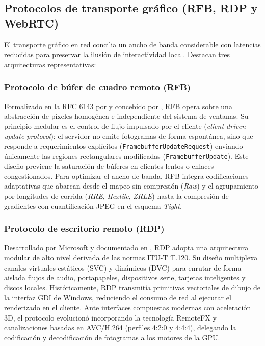 \documentclass[12pt]{article}
\begin{document}
\subsection{Protocolos de transporte gráfico (RFB, RDP y WebRTC)}\label{sec:protocolosTransporte}

El transporte gráfico en red concilia un ancho de banda considerable con latencias reducidas para preservar la ilusión de interactividad local. Destacan tres arquitecturas representativas:

\subsubsection{Protocolo de búfer de cuadro remoto (RFB)}
Formalizado en la RFC 6143 por \textcite{rfc6143} y concebido por \textcite{richardson1998virtual}, RFB opera sobre una abstracción de píxeles homogénea e independiente del sistema de ventanas. Su principio medular es el control de flujo impulsado por el cliente (\textit{client-driven update protocol}): el servidor no emite fotogramas de forma espontánea, sino que responde a requerimientos explícitos (\texttt{FramebufferUpdateRequest}) enviando únicamente las regiones rectangulares modificadas (\texttt{FramebufferUpdate}). Este diseño previene la saturación de búferes en clientes lentos o enlaces congestionados. Para optimizar el ancho de banda, RFB integra codificaciones adaptativas que abarcan desde el mapeo sin compresión (\textit{Raw}) y el agrupamiento por longitudes de corrida (\textit{RRE}, \textit{Hextile}, \textit{ZRLE}) hasta la compresión de gradientes con cuantificación JPEG en el esquema \textit{Tight}.

\subsubsection{Protocolo de escritorio remoto (RDP)}
Desarrollado por Microsoft y documentado en \textcite{microsoftRdpSpecification}, RDP adopta una arquitectura modular de alto nivel derivada de las normas ITU-T T.120. Su diseño multiplexa canales virtuales estáticos (SVC) y dinámicos (DVC) para enrutar de forma aislada flujos de audio, portapapeles, dispositivos serie, tarjetas inteligentes y discos locales. Históricamente, RDP transmitía primitivas vectoriales de dibujo de la interfaz GDI de Windows, reduciendo el consumo de red al ejecutar el renderizado en el cliente. Ante interfaces compuestas modernas con aceleración 3D, el protocolo evolucionó incorporando la tecnología RemoteFX y canalizaciones basadas en AVC/H.264 (perfiles 4:2:0 y 4:4:4), delegando la codificación y decodificación de fotogramas a los motores de la GPU.
\end{document}
